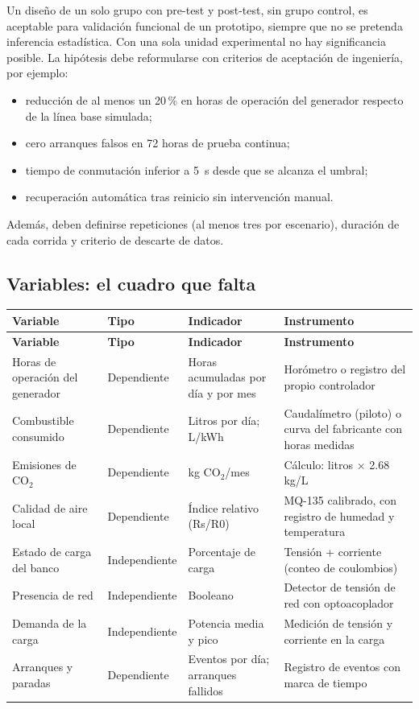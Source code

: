 \documentclass[11pt,a4paper]{article}
\begin{document}
Un diseño de un solo grupo con pre-test y post-test, sin grupo control, es aceptable para validación funcional de un prototipo, siempre que no se pretenda inferencia estadística. Con una sola unidad experimental no hay significancia posible. La hipótesis debe reformularse con criterios de aceptación de ingeniería, por ejemplo:

\begin{itemize}[leftmargin=1.3em, itemsep=2pt]
  \item reducción de al menos un 20\,\% en horas de operación del generador respecto de la línea base simulada;
  \item cero arranques falsos en 72 horas de prueba continua;
  \item tiempo de conmutación inferior a 5~s desde que se alcanza el umbral;
  \item recuperación automática tras reinicio sin intervención manual.
\end{itemize}

Además, deben definirse repeticiones (al menos tres por escenario), duración de cada corrida y criterio de descarte de datos.

\subsection{Variables: el cuadro que falta}

\begingroup\footnotesize
\begin{longtable}{@{}>{\raggedright\arraybackslash}p{2.5cm} >{\raggedright\arraybackslash}p{2.5cm} >{\raggedright\arraybackslash}p{5.0cm} >{\raggedright\arraybackslash}p{5.0cm}@{}}
\toprule
\textbf{Variable} & \textbf{Tipo} & \textbf{Indicador} & \textbf{Instrumento} \\
\midrule
\endfirsthead
\toprule
\textbf{Variable} & \textbf{Tipo} & \textbf{Indicador} & \textbf{Instrumento} \\
\midrule
\endhead
Horas de operación del generador & Dependiente & Horas acumuladas por día y por mes & Horómetro o registro del propio controlador \\
Combustible consumido & Dependiente & Litros por día; L/kWh & Caudalímetro (piloto) o curva del fabricante con horas medidas \\
Emisiones de CO$_2$ & Dependiente & kg CO$_2$/mes & Cálculo: litros $\times$ 2.68 kg/L \\
Calidad de aire local & Dependiente & Índice relativo (Rs/R0) & MQ-135 calibrado, con registro de humedad y temperatura \\
Estado de carga del banco & Independiente & Porcentaje de carga & Tensión + corriente (conteo de coulombios) \\
Presencia de red & Independiente & Booleano & Detector de tensión de red con optoacoplador \\
Demanda de la carga & Independiente & Potencia media y pico & Medición de tensión y corriente en la carga \\
Arranques y paradas & Dependiente & Eventos por día; arranques fallidos & Registro de eventos con marca de tiempo \\
\bottomrule
\end{longtable}
\endgroup
\end{document}
